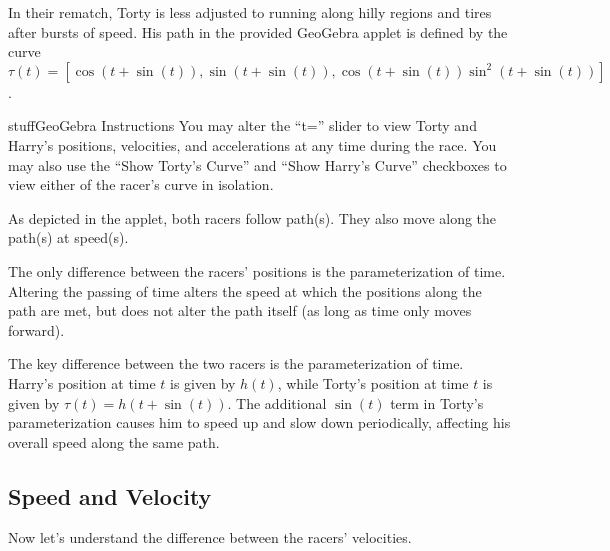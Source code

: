 \documentclass{ximera}
\begin{document}
In their rematch, Torty is less adjusted to running along hilly regions and tires after bursts of speed. His path in the provided GeoGebra applet is defined by the curve $\tau (t)=[ \cos(t+\sin(t)), \sin(t+\sin(t)), \cos(t+\sin(t))\sin^2(t+\sin(t))]$.

\begin{expandable}{stuff}{GeoGebra Instructions}
    You may alter the ``t='' slider to view Torty and Harry's positions, velocities, and accelerations at any time during the race. You may also use the ``Show Torty's Curve'' and ``Show Harry's Curve'' checkboxes to view either of the racer's curve in isolation.
\end{expandable}

\begin{center}
\end{center}

\begin{problem}
    As depicted in the applet, both racers follow  path(s). They also move along the path(s) at  speed(s).

    \begin{feedback}
        The only difference between the racers' positions is the parameterization of time. Altering the passing of time alters the speed at which the positions along the path are met, but does not alter the path itself (as long as time only moves forward).
    \end{feedback}
\end{problem}

\begin{remark}
    The key difference between the two racers is the parameterization of time. Harry's position at time $t$ is given by $h(t)$, while Torty's position at time $t$ is given by $\tau(t)=h(t+\sin(t))$. The additional $\sin(t)$ term in Torty's parameterization causes him to speed up and slow down periodically, affecting his overall speed along the same path.
\end{remark}

\subsection*{Speed and Velocity}

Now let's understand the difference between the racers' velocities. 
\end{document}
